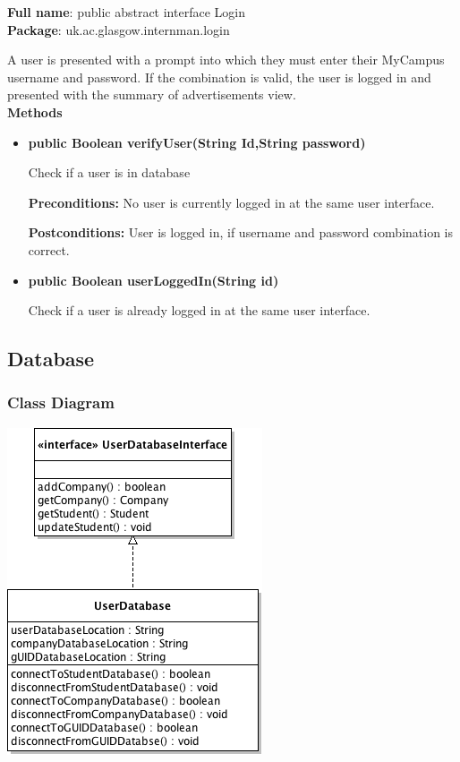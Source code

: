 \documentclass[11pt]{l3deliverable}
\begin{document}
\textbf{Full name}: public abstract interface Login\\

\textbf{Package}: uk.ac.glasgow.internman.login

A user is presented with a prompt into which they must enter their MyCampus 
username and password. If the combination is valid, the user is logged in and 
presented with the summary of advertisements view.\\

\textbf{Methods}

\begin{itemize}

\item{\textbf{public Boolean verifyUser(String Id,String password)}

Check if a user is in database 

\textbf{Preconditions:} No user is currently logged in at the same user 
interface.

\textbf{Postconditions:} User is logged in, if username and password combination 
is correct.}

\item{\textbf{public Boolean userLoggedIn(String id)}

Check if a user is already logged in at the same user interface.}

\end{itemize}

\newpage

\subsection{Database}

\subsubsection{Class Diagram}

\includegraphics{databaseClassDiagram.png}
\end{document}
